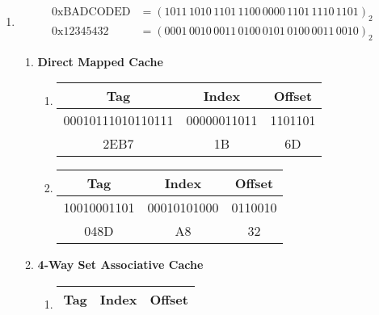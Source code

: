 \documentclass[a4paper, 12pt, margins=2cm]{homework}
\begin{document}
\begin{solution}
\begin{enumerate}[label=(\alph*)]
    \item \begin{align*}
            \text{0xBADCODED} &= (1011\,1010\,1101\,1100\,0000\,1101\,1110\,1101)_2 \\
            \text{0x12345432} &= (0001\,0010\,0011\,0100\,0101\,0100\,0011\,0010)_2
          \end{align*}
      \begin{enumerate}[label=(\arabic*)]\itemsep0pt
        \item \textbf{Direct Mapped Cache}
          \begin{enumerate}[label=(\arabic*)]\itemsep0pt
            \item \hfill
              \begin{center}
                \begin{tabular}{|c|c|c|}
                  \hline
                  Tag               & Index       & Offset  \\ \hline \hline
                  00010111010110111 & 00000011011 & 1101101 \\ \hline
                  2EB7              & 1B          & 6D      \\ \hline
                \end{tabular}
              \end{center}
            \item \hfill
              \begin{center}
                \begin{tabular}{|c|c|c|}
                  \hline
                  Tag         & Index       & Offset  \\ \hline \hline
                  10010001101 & 00010101000 & 0110010 \\ \hline
                  048D        & A8          & 32      \\ \hline
                \end{tabular}
              \end{center}
          \end{enumerate}
        \item \textbf{4-Way Set Associative Cache}
          \begin{enumerate}[label=(\arabic*)]\itemsep0pt
            \item \hfill
              \begin{center}
                \begin{tabular}{|c|c|c|}
                  \hline
                  Tag                 & Index     & Offset  \\ \hline \hline

\end{tabular}
\end{center}
\end{enumerate}
\end{enumerate}
\end{enumerate}
\end{solution}
\end{document}
